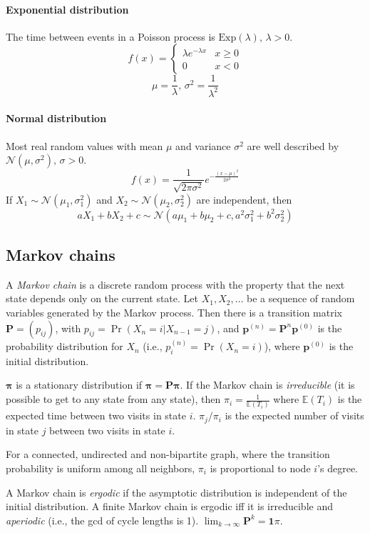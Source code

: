 \begin{multicols}{\Columns}
\paragraph{Exponential distribution}
The time between events in a Poisson process is $\textrm{Exp}(\lambda),\,\lambda>0$.
\[f(x) = \left\{
\begin{array}{cl}
\lambda e^{-\lambda x} & x\geq0\\
0 & x<0
\end{array}\right.\]
\[\mu=\frac{1}{\lambda},\,\sigma^2=\frac{1}{\lambda^2}\]

\paragraph{Normal distribution}
Most real random values with mean $\mu$ and variance $\sigma^2$ are well described by $\mathcal{N}(\mu,\sigma^2),\,\sigma>0$.
\[ f(x) = \frac{1}{\sqrt{2\pi\sigma^2}}e^{-\frac{(x-\mu)^2}{2\sigma^2}} \]
If $X_1 \sim \mathcal{N}(\mu_1,\sigma_1^2)$ and $X_2 \sim \mathcal{N}(\mu_2,\sigma_2^2)$ are independent, then
\[ aX_1 + bX_2 + c \sim \mathcal{N}(a\mu_1+b\mu_2+c,a^2\sigma_1^2+b^2\sigma_2^2) \]

\subsection{Markov chains}
A \emph{Markov chain} is a discrete random process with the property that the next state depends only on the current state.
Let $X_1,X_2,\ldots$ be a sequence of random variables generated by the Markov process.
Then there is a transition matrix $\mathbf{P} = (p_{ij})$, with $p_{ij} = \Pr(X_n = i | X_{n-1} = j)$,
and $\mathbf{p}^{(n)} = \mathbf P^n \mathbf p^{(0)}$ is the probability distribution for $X_n$ (i.e., $p^{(n)}_i = \Pr(X_n = i)$),
where $\mathbf{p}^{(0)}$ is the initial distribution.

$\mathbf{\pi}$ is a stationary distribution if $\mathbf{\pi} = \mathbf{P \pi}$.
If the Markov chain is \emph{irreducible} (it is possible to get to any state from any state),
then $\pi_i = \frac{1}{\mathbb{E}(T_i)}$ where $\mathbb{E}(T_i)$  is the expected time between two visits in state $i$.
$\pi_j/\pi_i$ is the expected number of visits in state $j$ between two visits in state $i$.

For a connected, undirected and non-bipartite graph, where the transition probability is uniform among all neighbors, $\pi_i$ is proportional to node $i$'s degree.

A Markov chain is \emph{ergodic} if the asymptotic distribution is independent of the initial distribution.
A finite Markov chain is ergodic iff it is irreducible and \emph{aperiodic} (i.e., the gcd of cycle lengths is 1).
$\lim_{k\rightarrow\infty}\mathbf{P}^k = \mathbf{1}\pi$.


\end{multicols}
